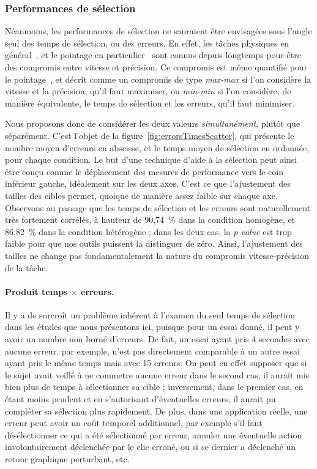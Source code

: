 	\subsubsection{Performances de sélection}
	\label{sub:product}
	Néanmoins, les performances de sélection ne sauraient être envisagées sous l'angle seul des temps de sélection, ou des erreurs. En effet, les tâches physiques en général~\cite{woodworth1899accuracy}, et le pointage en particulier~\cite{fitts1966cognitive} sont connus depuis longtemps pour être des compromis entre vitesse et précision. Ce compromis est même quantifié pour le pointage~\cite{mackenzie2008fitts, guiard2011fitt, guiard2015mathematical}, et décrit comme un compromis de type \emph{max-max} si l'on considère la vitesse et la précision, qu'il faut maximiser, ou \emph{min-min} si l'on considère, de manière équivalente, le temps de sélection et les erreurs, qu'il faut minimiser.
	
	Nous proposons donc de considérer les deux valeurs \emph{simultanément}, plutôt que séparément. C'est l'objet de la figure~\ref{fig:errorsTimesScatter}, qui présente le nombre moyen d'erreurs en abscisse, et le temps moyen de sélection en ordonnée, pour chaque condition. Le but d'une technique d'aide à la sélection peut ainsi être conçu comme le déplacement des mesures de performance vers le coin inférieur gauche, idéalement sur les deux axes. C'est ce que l'ajustement des tailles des cibles permet, quoique de manière assez faible sur chaque axe. Observons au passage que les temps de sélection et les erreurs sont naturellement très fortement corrélés, à hauteur de 90,74~\%{} dans la condition homogène, et 86,82~\%{} dans la condition hétérogène ; dans les deux cas, la \emph{p-value} est trop faible pour que nos outils puissent la distinguer de zéro. Ainsi, l'ajustement des tailles ne change pas fondamentalement la nature du compromis vitesse-précision de la tâche.
	
	\paragraph{Produit temps $\times$ erreurs.}
	Il y a de surcroît un problème inhérent à l'examen du seul temps de sélection dans les études que nous présentons ici, puisque pour un essai donné, il peut y avoir un nombre non borné d'erreurs. De fait, un essai ayant pris 4 secondes avec aucune erreur, par exemple, n'est pas directement comparable à un autre essai ayant pris le même temps mais avec 15 erreurs. On peut en effet supposer que si le sujet avait veillé à ne commetre aucune erreur dans le second cas, il aurait mis bien plus de temps à sélectionner sa cible ; inversement, dans le premier cas, en étant moins prudent et en s'autorisant d'éventuelles erreurs, il aurait pu compléter sa sélection plus rapidement. De plus, dans une application réelle, une erreur peut avoir un \og coût \fg{} temporel additionnel, par exemple s'il faut désélectionner ce qui a été sélectionné par erreur, annuler une éventuelle action involontairement déclenchée par le clic erroné, ou si ce dernier a déclenché un retour graphique perturbant, etc.
	
